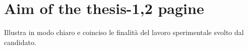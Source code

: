 
\chapter{Aim of the thesis-1,2 pagine} %

\label{Chapter4} %


Illustra in modo chiaro e coinciso le finalità del lavoro sperimentale svolto dal candidato. 